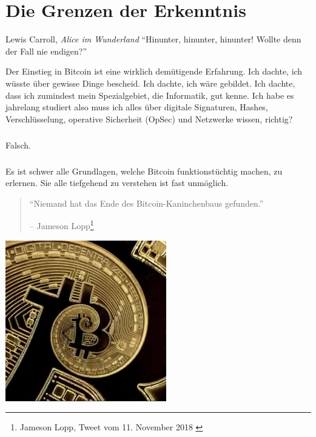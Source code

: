 \chapter{Die Grenzen der Erkenntnis}
\label{les:7}

\begin{chapquote}{Lewis Carroll, \textit{Alice im Wunderland}}
\enquote{Hinunter, hinunter, hinunter! Wollte denn der Fall nie endigen?}
\end{chapquote}

Der Einstieg in Bitcoin ist eine wirklich demütigende Erfahrung. Ich dachte, ich
wüsste über gewisse Dinge bescheid. Ich dachte, ich wäre gebildet. Ich dachte,
dass ich zumindest mein Spezialgebiet, die Informatik, gut kenne. Ich habe es
jahrelang studiert also muss ich alles über digitale Signaturen, Hashes,
Verschlüsselung, operative Sicherheit (OpSec) und Netzwerke wissen, richtig?

\paragraph{}
Falsch.

\paragraph{}
Es ist schwer alle Grundlagen, welche Bitcoin funktionstüchtig machen, zu
erlernen. Sie alle tiefgehend zu verstehen ist fast unmöglich.

\begin{quotation}\begin{samepage}
\enquote{Niemand hat das Ende des Bitcoin-Kaninchenbaus gefunden.}
\begin{flushright} -- Jameson Lopp\footnote{Jameson Lopp, Tweet vom 11. November 2018 \cite{lopp-tweet}}
\end{flushright}\end{samepage}\end{quotation}

\begin{center}
  \centering
  \includegraphics[width=7cm]{assets/images/rabbit-hole-bottomless.png}
  \label{fig:rabbit-hole-bottomless}
\end{center}

